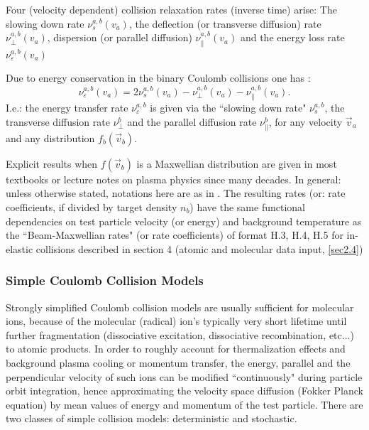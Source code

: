 Four (velocity dependent) collision relaxation rates (inverse time) arise: The slowing down rate
$\nu_s^{a,b}(v_a)$, the deflection (or transverse diffusion) rate $\nu_\perp^{a,b}(v_a)$, dispersion (or parallel diffusion) $\nu_\parallel^{a,b}(v_a)$ and the energy loss rate $\nu_\varepsilon^{a,b}(v_a)$

Due to energy conservation in the binary Coulomb collisions one has \cite{kn:NRL}:
\begin{equation}\label{eps1}
\nu_\varepsilon^{a,b}(v_a) = 2 \nu_s^{a,b}(v_a) - \nu_\perp^{a,b}(v_a) - \nu_\parallel^{a,b}(v_a).
\end{equation}
I.e.: the energy transfer rate $\nu_\varepsilon^{a,b}$ is given via the ``slowing down rate" $\nu_s^{a,b}$, the transverse diffusion
rate $\nu_\perp^b$ and the parallel diffusion rate
$\nu_\parallel^b$, for any velocity $\vec v_a$ and any distribution $f_b(\vec v_b)$.

Explicit results when $f(\vec v_b)$ is a Maxwellian distribution are given in most textbooks or lecture notes
on plasma physics since many decades. In general: unless otherwise stated, notations here are as in \cite{kn:NRL}.
The resulting rates (or: rate coefficients, if divided by target density $n_b$) have the same functional dependencies
on test particle velocity (or energy) and background temperature as the ``Beam-Maxwellian rates" (or rate coefficients)
of format H.3, H.4, H.5 for in-elastic collisions described in section 4 (atomic and molecular data input, \ref{sec2.4})

\subsubsection{Simple Coulomb Collision Models}
Strongly simplified Coulomb collision models are usually sufficient for molecular ions,
because of the molecular (radical) ion's typically very short lifetime until further fragmentation (dissociative excitation,
dissociative recombination, etc...) to atomic products. In order to roughly account for thermalization effects
and background plasma
cooling or momentum transfer,  the energy, parallel and the perpendicular velocity of such ions can be
modified ``continuously" during particle orbit integration, hence approximating the velocity space
diffusion (Fokker Planck equation) by mean values of energy and momentum of the test particle.
There are two classes of simple collision models: deterministic and stochastic.
